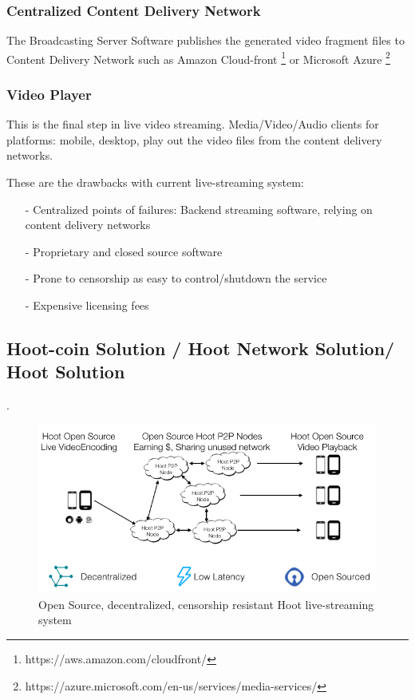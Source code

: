 \documentclass{article}
\begin{document}
\subsubsection{Centralized Content Delivery Network}
The Broadcasting Server Software publishes the generated video fragment files to Content Delivery Network such as Amazon Cloud-front \footnote{https://aws.amazon.com/cloudfront/} or Microsoft Azure \footnote{https://azure.microsoft.com/en-us/services/media-services/}

\subsubsection{Video Player}
This is the final step in live video streaming. Media/Video/Audio clients for platforms: mobile, desktop, play out the video files from the content delivery networks.


These are the drawbacks with current live-streaming system:
\begin{itemize}
 \item[-]Centralized points of failures: Backend streaming software, relying on content delivery networks
 \item[-]Proprietary and closed source software
 \item[-]Prone to censorship as easy to control/shutdown the service
 \item[-]Expensive licensing fees
\end{itemize}

\subsection{Hoot-coin Solution / Hoot Network Solution/ Hoot Solution}
 .

\begin{figure}[h!]
 \centering
 \includegraphics[width=1.0\textwidth]{static/hoot-solution}
 \caption{Open Source, decentralized, censorship resistant Hoot live-streaming system}
 \label{image:hoot-solution}
\end{figure}
\end{document}
